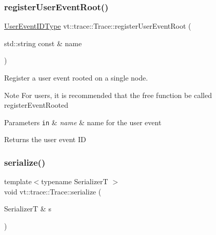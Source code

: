 \subsubsection{\texorpdfstring{register\+User\+Event\+Root()}{registerUserEventRoot()}}
{\footnotesize\ttfamily \hyperlink{namespacevt_1_1trace_a5908920d051c144c89f17c69ed262350}{User\+Event\+I\+D\+Type} vt\+::trace\+::\+Trace\+::register\+User\+Event\+Root (\begin{DoxyParamCaption}\item[{std\+::string const \&}]{name }\end{DoxyParamCaption})}



Register a user event rooted on a single node. 

\begin{DoxyNote}{Note}
For users, it is recommended that the free function be called {\ttfamily register\+Event\+Rooted} 
\end{DoxyNote}

\begin{DoxyParams}[1]{Parameters}
\mbox{\tt in}  & {\em name} & name for the user event\\
\hline
\end{DoxyParams}
\begin{DoxyReturn}{Returns}
the user event ID 
\end{DoxyReturn}
\mbox{\label{structvt_1_1trace_1_1_trace_a737d62cb21f0b634ca5a45e0221f7ee9}} 
\subsubsection{\texorpdfstring{serialize()}{serialize()}}
{\footnotesize\ttfamily template$<$typename SerializerT $>$ \\
void vt\+::trace\+::\+Trace\+::serialize (\begin{DoxyParamCaption}\item[{SerializerT \&}]{s }\end{DoxyParamCaption})\hspace{0.3cm}{\ttfamily [inline]}}

\mbox{\label{structvt_1_1trace_1_1_trace_aa2740411eec8e1dabf10d60f48193e69}} 
